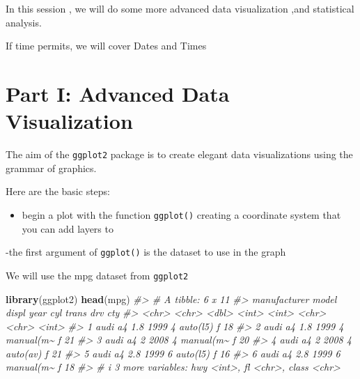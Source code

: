 \documentclass[
]{book}
\newenvironment{Shaded}{\begin{snugshade}}{\end{snugshade}}
\newcommand{\CommentTok}[1]{\textcolor[rgb]{0.56,0.35,0.01}{\textit{#1}}}
\newcommand{\FunctionTok}[1]{\textcolor[rgb]{0.13,0.29,0.53}{\textbf{#1}}}
\newcommand{\NormalTok}[1]{#1}
\providecommand{\tightlist}{%
  \setlength{\itemsep}{0pt}\setlength{\parskip}{0pt}}
\begin{document}
In this session , we will do some more advanced data visualization ,and statistical analysis.

If time permits, we will cover Dates and Times

\chapter*{Part I: Advanced Data Visualization}\label{part-i-advanced-data-visualization}

The aim of the \texttt{ggplot2} package is to create elegant data visualizations using the grammar of graphics.

Here are the basic steps:

\begin{itemize}
\tightlist
\item
  begin a plot with the function \texttt{ggplot()} creating a coordinate system that you can add layers to
\end{itemize}

-the first argument of \texttt{ggplot()} is the dataset to use in the graph

We will use the mpg dataset from \texttt{ggplot2}

\begin{Shaded}
\begin{Highlighting}[]
\FunctionTok{library}\NormalTok{(ggplot2)}
\FunctionTok{head}\NormalTok{(mpg)}
\CommentTok{\#\textgreater{} \# A tibble: 6 x 11}
\CommentTok{\#\textgreater{}   manufacturer model displ  year   cyl trans     drv     cty}
\CommentTok{\#\textgreater{}   \textless{}chr\textgreater{}        \textless{}chr\textgreater{} \textless{}dbl\textgreater{} \textless{}int\textgreater{} \textless{}int\textgreater{} \textless{}chr\textgreater{}     \textless{}chr\textgreater{} \textless{}int\textgreater{}}
\CommentTok{\#\textgreater{} 1 audi         a4      1.8  1999     4 auto(l5)  f        18}
\CommentTok{\#\textgreater{} 2 audi         a4      1.8  1999     4 manual(m\textasciitilde{} f        21}
\CommentTok{\#\textgreater{} 3 audi         a4      2    2008     4 manual(m\textasciitilde{} f        20}
\CommentTok{\#\textgreater{} 4 audi         a4      2    2008     4 auto(av)  f        21}
\CommentTok{\#\textgreater{} 5 audi         a4      2.8  1999     6 auto(l5)  f        16}
\CommentTok{\#\textgreater{} 6 audi         a4      2.8  1999     6 manual(m\textasciitilde{} f        18}
\CommentTok{\#\textgreater{} \# i 3 more variables: hwy \textless{}int\textgreater{}, fl \textless{}chr\textgreater{}, class \textless{}chr\textgreater{}}
\end{Highlighting}
\end{Shaded}
\end{document}
